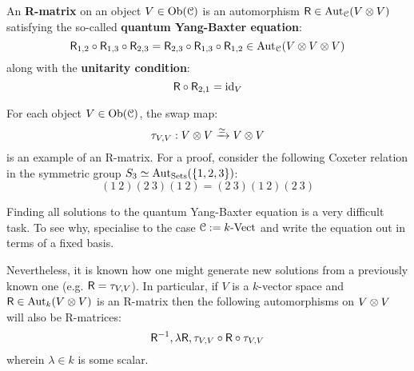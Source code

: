         \begin{definition}[R-matrices] \label{def: R_matrices}
            An \textbf{R-matrix} on an object $V \in \mathrm{Ob}(\mathcal{C})$ is an automorphism $\sfR \in \Aut_{\C}(V \tensor V)$ satisfying the so-called \textbf{quantum Yang-Baxter equation}:
                $$\sfR_{1, 2} \circ \sfR_{1, 3} \circ \sfR_{2, 3} = \sfR_{2, 3} \circ \sfR_{1, 3} \circ \sfR_{1, 2} \in \Aut_{\C}(V \tensor V \tensor V)$$
            along with the \textbf{unitarity condition}:
                $$\mathsf{R} \circ \mathsf{R}_{2, 1} = \mathrm{id}_V$$
        \end{definition}
        \begin{example}
            For each object $V \in \mathrm{Ob}(\mathcal{C})$, the swap map:
                $$\tau_{V, V}: V \tensor V \xrightarrow[]{\cong} V \tensor V$$
            is an example of an R-matrix. For a proof, consider the following Coxeter relation in the symmetric group $S_3 \simeq \mathrm{Aut}_{\mathrm{Sets}}(\{1, 2, 3\})$:
                $$(1 \: 2)(2 \: 3)(1 \: 2) = (2 \: 3)(1 \: 2)(2 \: 3)$$
        \end{example}
        \begin{remark}
            Finding all solutions to the quantum Yang-Baxter equation is a very difficult task. To see why, specialise to the case $\mathcal{C} := k\text{-}\mathrm{Vect}$ and write the equation out in terms of a fixed basis. 
            
            Nevertheless, it is known how one might generate new solutions from a previously known one (e.g. $\mathsf{R} = \tau_{V, V}$). In particular, if $V$ is a $k$-vector space and $\sfR \in \Aut_k(V \tensor V)$ is an R-matrix then the following automorphisms on $V \tensor V$ will also be R-matrices:
                $$\mathsf{R}^{-1}, \lambda \mathsf{R}, \tau_{V, V} \circ \mathsf{R} \circ \tau_{V, V}$$
            wherein $\lambda \in k$ is some scalar.
        \end{remark}

